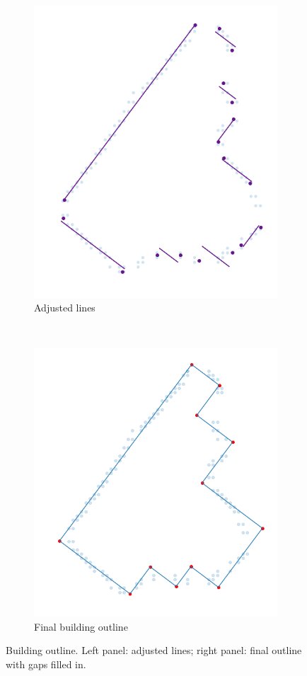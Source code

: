 \begin{figure}[H]
    \centering
	\begin{subfigure}{0.45\textwidth}
    	\includegraphics[width=0.9\linewidth]{chapters/challenges/images/adjusted_lines.png}		    		\caption{Adjusted lines}
    	\label{fig:challenges:adjusted_lines}
	\end{subfigure}~
	\begin{subfigure}{0.45\textwidth}
    	\includegraphics[width=0.9\linewidth]{chapters/challenges/images/filled_gaps.png}       				\caption{Final building outline}
    	\label{fig:challenges:final_building_outline}
	\end{subfigure}
	\caption{Building outline. Left panel: adjusted lines; right panel: final outline with gaps filled in.}
	\label{fig:challenges:building_ground_truths}
\end{figure}